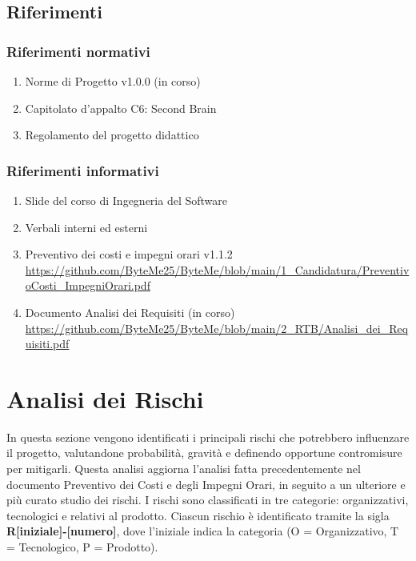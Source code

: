 \documentclass[11pt,a4paper]{article}
\begin{document}
\subsection{Riferimenti}
\subsubsection{Riferimenti normativi}
\begin{enumerate}
    \item Norme di Progetto v1.0.0 (in corso)
    \item Capitolato d’appalto C6: Second Brain
    \item Regolamento del progetto didattico
\end{enumerate}

\subsubsection{Riferimenti informativi}
\begin{enumerate}
    \item Slide del corso di Ingegneria del Software
    \item Verbali interni ed esterni
    \item Preventivo dei costi e impegni orari v1.1.2 
    \url{https://github.com/ByteMe25/ByteMe/blob/main/1_Candidatura/PreventivoCosti_ImpegniOrari.pdf}
    \item Documento Analisi dei Requisiti (in corso) 
    \url{https://github.com/ByteMe25/ByteMe/blob/main/2_RTB/Analisi_dei_Requisiti.pdf}
\end{enumerate}

\newpage

\section{Analisi dei Rischi}
In questa sezione vengono identificati i principali rischi che potrebbero influenzare il progetto, valutandone probabilità, gravità e definendo opportune contromisure per mitigarli. Questa analisi aggiorna l'analisi fatta precedentemente nel documento Preventivo dei Costi e degli Impegni Orari, in seguito a un ulteriore e più curato studio dei rischi.
I rischi sono classificati in tre categorie: organizzativi, tecnologici e relativi al prodotto. Ciascun rischio è identificato tramite la sigla \textbf{R[iniziale]-[numero]}, dove l'iniziale indica la categoria (O = Organizzativo, T = Tecnologico, P = Prodotto).
\end{document}
